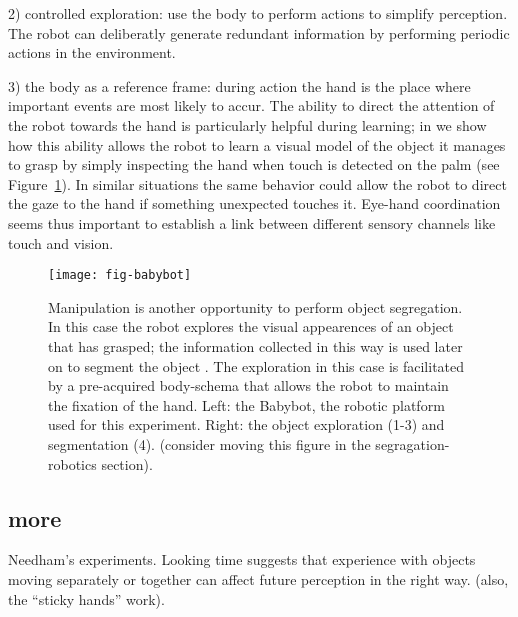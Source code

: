 2) controlled exploration: use the body to perform actions to simplify perception. The robot can deliberatly generate redundant information by performing periodic actions in the environment.

3) the body as a reference frame: during action the hand is the place where important events are most likely to accur. The ability to direct the attention of the robot towards the hand is particularly helpful during learning; in \cite{natale05exploring} we show how this ability allows the robot to learn a visual model of the object it manages to grasp by simply inspecting the hand when touch is detected on the palm (see Figure~\ref{fig:babybot}). In similar situations the same behavior could allow the robot to direct the gaze to the hand if something unexpected touches it. Eye-hand coordination seems thus important to establish a link between different sensory channels like touch and vision.


\begin{figure}[t]

\centerline{
\texttt{[image: fig-babybot]}
}

\caption{
%
Manipulation is another opportunity to perform object segregation. In this case the robot explores the visual appearences of an object that has grasped; the information collected in this way is used later on to segment the object \cite{natale05exploring}. The exploration in this case is facilitated by a pre-acquired body-schema that allows the robot to maintain the fixation of the hand. Left: the Babybot, the robotic platform used for this experiment. Right: the object exploration (1-3) and segmentation (4). (consider moving this figure in the segragation-robotics section). 
%
}

\label{fig:babybot}

\end{figure}

\subsection{more}

Needham's experiments. 
\cite{needham01object,needham97object}
Looking time suggests that experience with objects moving separately
or together can affect future perception in the right way.
(also, the ``sticky hands'' work).
